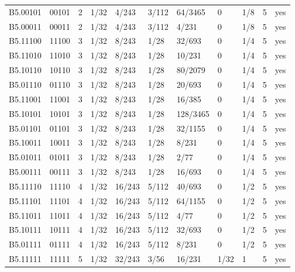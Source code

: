 {\begin{longtable}{@{}lllllllllll@{}}
B5.00101 & 00101 & 2 & 1/32 & 4/243 & 3/112 & 64/3465 & 0 & 1/8 & 5 & yes \\
B5.00011 & 00011 & 2 & 1/32 & 4/243 & 3/112 & 4/231 & 0 & 1/8 & 5 & yes \\
B5.11100 & 11100 & 3 & 1/32 & 8/243 & 1/28 & 32/693 & 0 & 1/4 & 5 & yes \\
B5.11010 & 11010 & 3 & 1/32 & 8/243 & 1/28 & 10/231 & 0 & 1/4 & 5 & yes \\
B5.10110 & 10110 & 3 & 1/32 & 8/243 & 1/28 & 80/2079 & 0 & 1/4 & 5 & yes \\
B5.01110 & 01110 & 3 & 1/32 & 8/243 & 1/28 & 20/693 & 0 & 1/4 & 5 & yes \\
B5.11001 & 11001 & 3 & 1/32 & 8/243 & 1/28 & 16/385 & 0 & 1/4 & 5 & yes \\
B5.10101 & 10101 & 3 & 1/32 & 8/243 & 1/28 & 128/3465 & 0 & 1/4 & 5 & yes \\
B5.01101 & 01101 & 3 & 1/32 & 8/243 & 1/28 & 32/1155 & 0 & 1/4 & 5 & yes \\
B5.10011 & 10011 & 3 & 1/32 & 8/243 & 1/28 & 8/231 & 0 & 1/4 & 5 & yes \\
B5.01011 & 01011 & 3 & 1/32 & 8/243 & 1/28 & 2/77 & 0 & 1/4 & 5 & yes \\
B5.00111 & 00111 & 3 & 1/32 & 8/243 & 1/28 & 16/693 & 0 & 1/4 & 5 & yes \\
B5.11110 & 11110 & 4 & 1/32 & 16/243 & 5/112 & 40/693 & 0 & 1/2 & 5 & yes \\
B5.11101 & 11101 & 4 & 1/32 & 16/243 & 5/112 & 64/1155 & 0 & 1/2 & 5 & yes \\
B5.11011 & 11011 & 4 & 1/32 & 16/243 & 5/112 & 4/77 & 0 & 1/2 & 5 & yes \\
B5.10111 & 10111 & 4 & 1/32 & 16/243 & 5/112 & 32/693 & 0 & 1/2 & 5 & yes \\
B5.01111 & 01111 & 4 & 1/32 & 16/243 & 5/112 & 8/231 & 0 & 1/2 & 5 & yes \\
B5.11111 & 11111 & 5 & 1/32 & 32/243 & 3/56 & 16/231 & 1/32 & 1 & 5 & yes \\
\end{longtable}}
